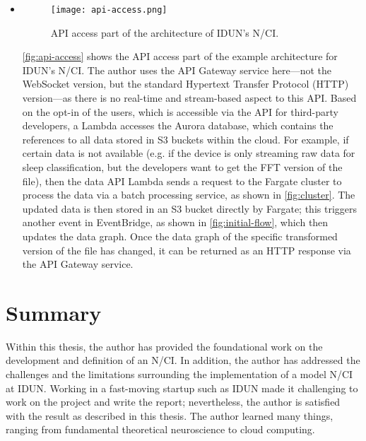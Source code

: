 \begin{itemize}
\newpage

  \item \begin{figure}[!ht]
          \centering
          \hspace*{0.4in}
          \texttt{[image: api-access.png]}
          \caption{API access part of the architecture of IDUN’s N/CI.}
          \label{fig:api-access}
        \end{figure}

        \autoref{fig:api-access} shows the API access part of the example architecture for IDUN’s N/CI. The author uses the API Gateway service here—not the WebSocket version, but the standard Hypertext Transfer Protocol (HTTP) version—as there is no real-time and stream-based aspect to this API. Based on the opt-in of the users, which is accessible via the API for third-party developers, a Lambda accesses the Aurora database, which contains the references to all data stored in S3 buckets within the cloud. For example, if certain data is not available (e.g. if the device is only streaming raw data for sleep classification, but the developers want to get the FFT version of the file), then the data API Lambda sends a request to the Fargate cluster to process the data via a batch processing service, as shown in \autoref{fig:cluster}. The updated data is then stored in an S3 bucket directly by Fargate; this triggers another event in EventBridge, as shown in \autoref{fig:initial-flow}, which then updates the data graph. Once the data graph of the specific transformed version of the file has changed, it can be returned as an HTTP response via the API Gateway service.

\end{itemize}

\section{Summary}
\label{chapter5-summary}

Within this thesis, the author has provided the foundational work on the development and definition of an N/CI. In addition, the author has addressed the challenges and the limitations surrounding the implementation of a model N/CI at IDUN. Working in a fast-moving startup such as IDUN made it challenging to work on the project and write the report; nevertheless, the author is satisfied with the result as described in this thesis. The author learned many things, ranging from fundamental theoretical neuroscience to cloud computing.

